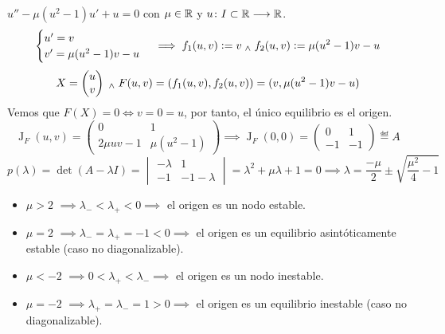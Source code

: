 \begin{ejem}
	$u'' - \mu(u^2 - 1)u' + u = 0$ con $\mu \in \mathbb{R}$ y $u \colon I\subset \mathbb{R} \longrightarrow \mathbb{R}$.
	\[\begin{cases}
			u' = v \\
			v' = \mu(u^2 - 1)v - u
		\end{cases} \implies f_1(u, v) \vcentcolon= v \; _{\wedge} \; f_2(u, v) \vcentcolon= \mu(u^2 - 1)v - u\]
	\[X = \begin{pmatrix}
			u \\
			v
		\end{pmatrix} \; _{\wedge} \; F(u, v) = (f_1(u, v), f_2(u, v)) = (v, \mu(u^2 - 1)v - u)\]
	Vemos que $F(X) = 0 \iff v = 0 = u$, por tanto, el único equilibrio es el origen.
	\[\operatorname{J}_F(u, v) = \begin{pmatrix}
			0           & 1            \\
			2\mu uv - 1 & \mu(u^2 - 1)
		\end{pmatrix} \implies \operatorname{J}_F(0, 0) = \begin{pmatrix}
			0  & 1  \\
			-1 & -1
		\end{pmatrix} \eqdef A\]
	\[p(\lambda) = \det(A - \lambda I) = \begin{vmatrix}
			-\lambda & 1          \\
			-1       & -1-\lambda
		\end{vmatrix} = \lambda^2 + \mu \lambda + 1 = 0 \implies \lambda = \frac{-\mu}{2} \pm \sqrt{\frac{\mu^2}{4} - 1}\]
	\begin{itemize}
		\item $\mu > 2$ $\implies \lambda_- < \lambda_+ < 0 \implies$ el origen es un nodo estable.
		\item $\mu = 2$ $\implies \lambda_- = \lambda_+ = -1 < 0 \implies$ el origen es un equilibrio asintóticamente estable (caso no diagonalizable).
		\item $\mu < -2$ $\implies 0 < \lambda_+ < \lambda_- \implies$ el origen es un nodo inestable.
		\item $\mu = -2$ $\implies \lambda_+ = \lambda_- = 1 > 0 \implies$ el origen es un equilibrio inestable (caso no diagonalizable).

\end{itemize}
\end{ejem}
